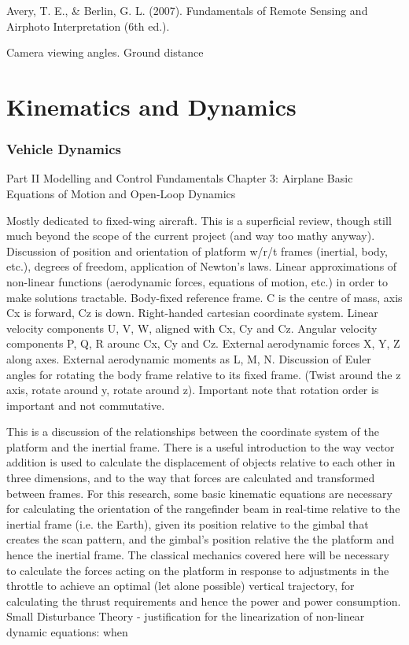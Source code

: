 \documentclass[10pt]{article}
\begin{document}
\cite{Avery2007}
Avery, T. E., \& Berlin, G. L. (2007). Fundamentals of Remote Sensing and Airphoto Interpretation (6th ed.).

Camera viewing angles.
Ground distance


\section{Kinematics and Dynamics}

\subsubsection{Vehicle Dynamics}

\cite{Valavanis2007}

Part II Modelling and Control Fundamentals
Chapter 3: Airplane Basic Equations of Motion and Open-Loop Dynamics

Mostly dedicated to fixed-wing aircraft.
This is a superficial review, though still much beyond the scope of the current project (and way too mathy anyway).
Discussion of position and orientation of platform w/r/t frames (inertial, body, etc.), degrees of freedom, application of Newton’s laws.
Linear approximations of non-linear functions (aerodynamic forces, equations of motion, etc.) in order to make solutions tractable.
Body-fixed reference frame. C is the centre of mass, axis Cx is forward, Cz is down. Right-handed cartesian coordinate system.
Linear velocity components U, V, W, aligned with Cx, Cy and Cz.
Angular velocity components P, Q, R arounc Cx, Cy and Cz.
External aerodynamic forces X, Y, Z along axes. External aerodynamic moments as L, M, N.
Discussion of Euler angles for rotating the body frame relative to its fixed frame. (Twist around the z axis, rotate around y, rotate around z).
Important note that rotation order is important and not commutative.


This is a discussion of the relationships between the coordinate system of the platform and the inertial frame. There is a useful introduction to the way vector addition is used to calculate the displacement of objects relative to each other in three dimensions, and to the way that forces are calculated and transformed between frames. 
For this research, some basic kinematic equations are necessary for calculating the orientation of the rangefinder beam in real-time relative to the inertial frame (i.e. the Earth), given its position relative to the gimbal that creates the scan pattern, and the gimbal’s position relative the the platform and hence the inertial frame. 
The classical mechanics covered here will be necessary to calculate the forces acting on the platform in response to adjustments in the throttle to achieve an optimal (let alone possible) vertical trajectory, for calculating the thrust requirements and hence the power and power consumption.
Small Disturbance Theory - justification for the linearization of non-linear dynamic equations: when 
\end{document}
